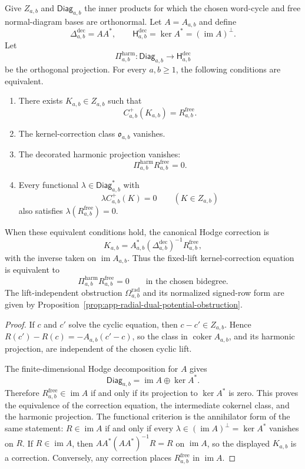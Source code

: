 \begin{stmt}
\label{stmt:app-free-kernel-homotopy-obstruction}
  Give \(Z_{a,b}\) and \(\mathsf{Diag}_{a,b}\) the inner products for
  which the chosen word-cycle and free normal-diagram bases are
  orthonormal.  Let \(A=A_{a,b}\) and define
  \[
    \Delta^{\mathrm{dec}}_{a,b}=AA^*,\qquad
    \mathsf H^{\mathrm{dec}}_{a,b}=\ker A^*
      =(\operatorname{im}A)^\perp .
  \]
  Let
  \[
    \Pi^{\mathrm{harm}}_{a,b}\colon
    \mathsf{Diag}_{a,b}\to\mathsf H^{\mathrm{dec}}_{a,b}
  \]
  be the orthogonal projection.  For every \(a,b\geq1\), the following
  conditions are equivalent.
  \begin{enumerate}
    \item There exists \(K_{a,b}\in Z_{a,b}\) such that
      \[
        C^+_{a,b}(K_{a,b})=R^{\mathrm{free}}_{a,b}.
      \]
    \item The kernel-correction class \(\mathfrak o_{a,b}\) vanishes.
    \item The decorated harmonic projection vanishes:
      \[
        \Pi^{\mathrm{harm}}_{a,b}R^{\mathrm{free}}_{a,b}=0.
      \]
    \item Every functional
      \(\lambda\in\mathsf{Diag}_{a,b}^{*}\) with
      \[
        \lambda C^+_{a,b}(K)=0\qquad(K\in Z_{a,b})
      \]
      also satisfies \(\lambda(R^{\mathrm{free}}_{a,b})=0\).
  \end{enumerate}
  When these equivalent conditions hold, the canonical Hodge correction is
  \[
    K_{a,b}=
    A_{a,b}^{*}(\Delta^{\mathrm{dec}}_{a,b})^{-1}
    R^{\mathrm{free}}_{a,b},
  \]
  with the inverse taken on \(\operatorname{im}A_{a,b}\).  Thus the
  fixed-lift kernel-correction equation is equivalent to
  \[
    \Pi^{\mathrm{harm}}_{a,b}R^{\mathrm{free}}_{a,b}=0
    \qquad\text{in the chosen bidegree.}
  \]
  The lift-independent obstruction
  \(\Omega^{\mathrm{rad}}_{a,b}\) and its normalized signed-row form
  are given by
  Proposition~\ref{prop:app-radial-dual-potential-obstruction}.
\end{stmt}

\begin{proof}
  If \(c\) and \(c'\) solve the cyclic equation, then
  \(c-c'\in Z_{a,b}\).  Hence
  \(R(c')-R(c)=-A_{a,b}(c'-c)\), so the class in
  \(\operatorname{coker}A_{a,b}\), and its harmonic projection, are
  independent of the chosen cyclic lift.

  The finite-dimensional Hodge decomposition for \(A\) gives
  \[
    \mathsf{Diag}_{a,b}=\operatorname{im}A\oplus\ker A^* .
  \]
  Therefore \(R^{\mathrm{free}}_{a,b}\in\operatorname{im}A\) if and
  only if its projection to \(\ker A^*\) is zero.  This proves the
  equivalence of the correction equation, the intermediate cokernel
  class, and the harmonic projection.  The functional criterion is the
  annihilator form of the same statement:
  \(R\in\operatorname{im}A\) if and only if every
  \(\lambda\in(\operatorname{im}A)^\perp=\ker A^*\) vanishes on \(R\).
  If \(R\in\operatorname{im}A\), then
  \(AA^*(AA^*)^{-1}R=R\) on \(\operatorname{im}A\), so the displayed
  \(K_{a,b}\) is a correction.  Conversely, any correction places
  \(R^{\mathrm{free}}_{a,b}\) in \(\operatorname{im}A\).
\end{proof}

